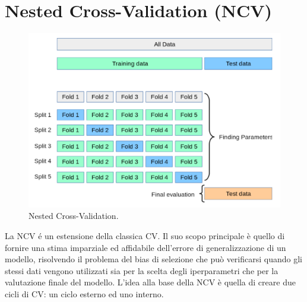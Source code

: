 \documentclass[a4paper,12pt]{report}
\begin{document}
	\section{Nested Cross-Validation (NCV)}
	\begin{figure}[H]
		\centering
		\includegraphics[width=1.0\textwidth]{img/ncv.png}
		\caption{Nested Cross-Validation.}
	\end{figure}
	La NCV é un estensione della classica CV. Il suo scopo principale è quello di fornire una stima imparziale ed affidabile dell'errore di generalizzazione di un modello, risolvendo il problema del bias di selezione che può verificarsi quando gli stessi dati vengono utilizzati sia per la scelta degli iperparametri che per la valutazione finale del modello. L'idea alla base della NCV è quella di creare due cicli di CV: un ciclo esterno ed uno interno. 
	
\end{document}
